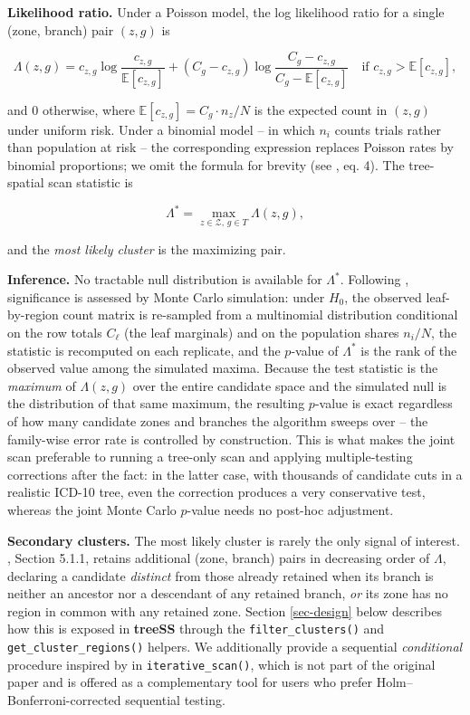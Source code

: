 \textbf{Likelihood ratio.} Under a Poisson model, the log likelihood ratio for
a single (zone, branch) pair \((z, g)\) is

\[
\Lambda(z, g) =
c_{z,g} \log \frac{c_{z,g}}{\mathbb{E}[c_{z,g}]} +
(C_g - c_{z,g}) \log \frac{C_g - c_{z,g}}{C_g - \mathbb{E}[c_{z,g}]}
\quad \text{if } c_{z,g} > \mathbb{E}[c_{z,g}],
\]

and \(0\) otherwise, where \(\mathbb{E}[c_{z,g}] = C_g \cdot n_z / N\) is the
expected count in \((z, g)\) under uniform risk. Under a binomial model -- in
which \(n_i\) counts trials rather than population at risk -- the
corresponding expression replaces Poisson rates by binomial proportions; we
omit the formula for brevity (see \citet{cancado2025}, eq. 4). The tree-spatial
scan statistic is

\[
\Lambda^* = \max_{z \in \mathcal{Z}, \, g \in T} \Lambda(z, g),
\]

and the \emph{most likely cluster} is the maximizing pair.

\textbf{Inference.} No tractable null distribution is available for \(\Lambda^*\).
Following \citet{kulldorff1997}, significance is assessed by Monte Carlo
simulation: under \(H_0\), the observed leaf-by-region count matrix is
re-sampled from a multinomial distribution conditional on the row totals
\(C_\ell\) (the leaf marginals) and on the population shares \(n_i / N\), the
statistic is recomputed on each replicate, and the \(p\)-value of \(\Lambda^*\)
is the rank of the observed value among the simulated maxima. Because the
test statistic is the \emph{maximum} of \(\Lambda(z, g)\) over the entire
candidate space and the simulated null is the distribution of that same
maximum, the resulting \(p\)-value is exact regardless of how many candidate
zones and branches the algorithm sweeps over -- the family-wise error rate
is controlled by construction. This is what makes the joint scan
preferable to running a tree-only scan and applying multiple-testing
corrections after the fact: in the latter case, with thousands of
candidate cuts in a realistic ICD-10 tree, even the \citet{holm1979} correction
produces a very conservative test, whereas the joint Monte Carlo \(p\)-value
needs no post-hoc adjustment.

\textbf{Secondary clusters.} The most likely cluster is rarely the only signal
of interest. \citet{cancado2025}, Section 5.1.1, retains additional (zone, branch)
pairs in decreasing order of \(\Lambda\), declaring a candidate \emph{distinct}
from those already retained when its branch is neither an ancestor nor a
descendant of any retained branch, \emph{or} its zone has no region in common
with any retained zone. Section \ref{sec-design} below describes how this
is exposed in \textbf{treeSS} through the \texttt{filter\_clusters()} and
\texttt{get\_cluster\_regions()} helpers. We additionally provide a sequential
\emph{conditional} procedure inspired by \citet{zhang2010} in \texttt{iterative\_scan()},
which is not part of the original paper and is offered as a complementary
tool for users who prefer Holm--Bonferroni-corrected sequential testing.

